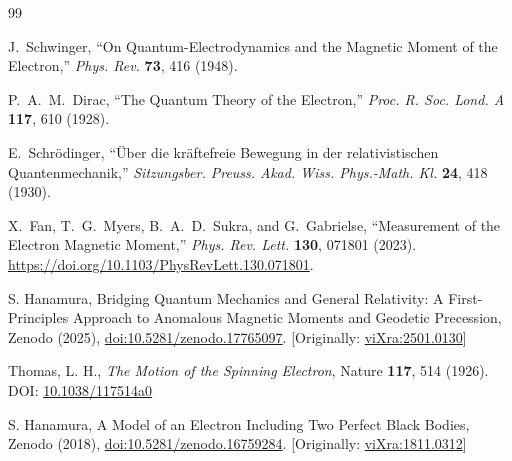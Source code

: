 \documentclass[%
 reprint,
 amsmath,amssymb,
 aps,
]{revtex4-1}
\numberwithin{equation}{section}%
\begin{document}
\begin{thebibliography}{99}

J.~Schwinger,
``On Quantum-Electrodynamics and the Magnetic Moment of the Electron,''
\textit{Phys. Rev.} \textbf{73}, 416 (1948).

P.~A.~M.~Dirac,
``The Quantum Theory of the Electron,''
\textit{Proc. R. Soc. Lond. A} \textbf{117}, 610 (1928).

E.~Schrödinger,
``Über die kräftefreie Bewegung in der relativistischen Quantenmechanik,''
\textit{Sitzungsber. Preuss. Akad. Wiss. Phys.-Math. Kl.} \textbf{24}, 418 (1930).

X.~Fan, T.~G.~Myers, B.~A.~D.~Sukra, and G.~Gabrielse, 
``Measurement of the Electron Magnetic Moment,'' 
\textit{Phys. Rev. Lett.} \textbf{130}, 071801 (2023). 
\href{https://doi.org/10.1103/PhysRevLett.130.071801}{https://doi.org/10.1103/PhysRevLett.130.071801}.

S. Hanamura, Bridging Quantum Mechanics and General Relativity: A First-Principles Approach to Anomalous Magnetic Moments and Geodetic Precession, Zenodo (2025), \href{https://doi.org/10.5281/zenodo.17765097}{doi:10.5281/zenodo.17765097}. [Originally: \href{https://vixra.org/abs/2501.0130}{viXra:2501.0130}]

Thomas, L. H., 
\textit{The Motion of the Spinning Electron}, 
Nature \textbf{117}, 514 (1926). 
DOI: \href{https://doi.org/10.1038/117514a0}{10.1038/117514a0}

S. Hanamura, A Model of an Electron Including Two Perfect Black Bodies, Zenodo (2018), \href{https://doi.org/10.5281/zenodo.16759284}{doi:10.5281/zenodo.16759284}. [Originally: \href{https://vixra.org/abs/1811.0312}{viXra:1811.0312}]

\end{thebibliography}
\end{document}

